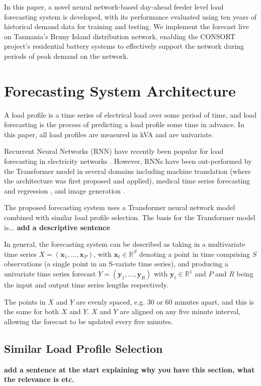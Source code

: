 \documentclass[conference]{IEEEtran}
\begin{document}
In this paper, a novel neural network-based day-ahead feeder level load forecasting system is developed, with its performance evaluated using ten years of historical demand data for training and testing. We implement the forecast live on Tasmania's Bruny Island distribution network, enabling the CONSORT project's residential battery systems to effectively support the network during periods of peak demand on the network.

\section{Forecasting System Architecture}
A load profile is a time series of electrical load over some period of time, and load forecasting is the process of predicting a load profile some time in advance.
In this paper, all load profiles are measured in kVA and are univariate.

Recurrent Neural Networks (RNN) have recently been popular for load forecasting in electricity networks \cite{Kong2018}.
However, RNNs have been out-performed by the Transformer \cite{Vaswani2017} model in several domains including machine translation \cite{Vaswani2017} (where the architecture was first proposed and applied), medical time series forecasting and regression \cite{Song2017}, and image generation \cite{Parmar2018}.
\par
The proposed forecasting system uses a Transformer neural network model combined with similar load profile selection.
The basis for the Transformer model is... \textbf{add a descriptive sentence}

In general, the forecasting system can be described as taking in a multivariate time series $X = (\boldsymbol{x}_1, ..., \boldsymbol{x}_P)$, with $\boldsymbol{x}_t \in \mathbb{R}^S$ denoting a point in time comprising $S$ observations (a single point in an S-variate time series), and producing a univariate time series forecast $Y = (\boldsymbol{y}_1, ..., \boldsymbol{y}_R)$ with $\boldsymbol{y}_t \in \mathbb{R}^1$ and $P$ and $R$ being the input and output time series lengths respectively.

The points in $X$ and $Y$ are evenly spaced, e.g. 30 or 60 minutes apart, and this is the same for both $X$ and $Y$.
$X$ and $Y$ are aligned on any five minute interval, allowing the forecast to be updated every five minutes.


\subsection{Similar Load Profile Selection}
\textbf{add a sentence at the start explaining why you have this section, what the relevance is etc.}
\end{document}
